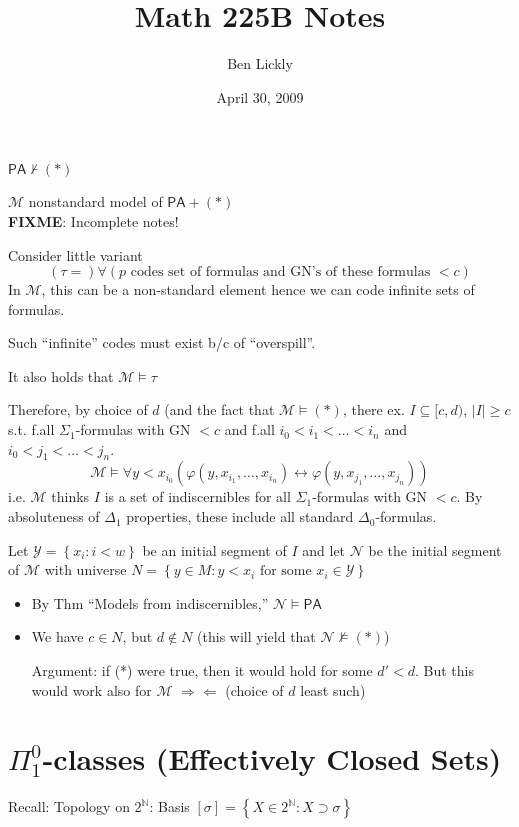\documentclass[12pt]{article}
\author{Ben Lickly}
\date{April 30, 2009}
\title{Math 225B Notes}
\newcommand{\Nat}{\ensuremath{\mathbb{N}}}
\newcommand{\PA}{\ensuremath{\mathsf{PA}}}
\newcommand{\proves}{\vdash}
\newcommand{\fixme}{\\ \textbf{FIXME}: Incomplete notes!}
\begin{document}
\maketitle

$\PA \not\proves (*)$

$\mathcal{M}$ nonstandard model of $\PA + (*)$
\fixme

Consider little variant
\[
(\tau = )
\forall (p \text{ codes set of formulas and GN's of these formulas $< c$})
\]
In $\mathcal{M}$, this can be a non-standard element hence we can code
infinite sets of formulas.

Such ``infinite'' codes must exist b/c of ``overspill''.

It also holds that $\mathcal{M} \models \tau$

Therefore, by choice of $d$ (and the fact that $\mathcal{M} \models (*)$,
there ex. $I \subseteq [c,d)$, $|I| \ge c$
s.t. f.all $\Sigma_1$-formulas with GN $< c$
and f.all $i_0 < i_1 < \dots < i_n$ and $i_0 < j_1 < \dots < j_n$.
\[
\mathcal{M} \models \forall y < x_{i_0} \left( \varphi(y,x_{i_1},\dots,x_{i_n})
\leftrightarrow \varphi(y,x_{j_1},\dots,x_{j_n})\right)
\]
i.e. $\mathcal{M}$ thinks $I$ is a set of indiscernibles for all
$\Sigma_1$-formulas with GN $< c$.
By absoluteness of $\Delta_1$ properties, these include all standard $\Delta_0$-formulas.

Let $\mathcal{Y} = \left\{ x_i : i < w \right\}$ be an initial segment of $I$
and let $\mathcal{N}$ be the initial segment of $\mathcal{M}$
with universe $N = \left\{ y\in M : y < x_i \text{ for some } x_i \in \mathcal{Y} \right\}$
\begin{itemize}
  \item By Thm ``Models from indiscernibles,'' $\mathcal{N} \models \PA$
  \item We have $c \in N$, but $d \not\in N$
    (this will yield that $\mathcal{N} \not\models (*)$)

    Argument: if (*) were true, then it would hold for some $d'<d$.
    But this would work also for $\mathcal{M}$
    $\Rightarrow\Leftarrow$ (choice of $d$ least such)
\end{itemize}

\section{$\Pi^0_1$-classes (Effectively Closed Sets)}

Recall: Topology on $2^\Nat$:
Basis $[\sigma] = \left\{ X \in 2^\Nat : X \supset \sigma \right\}$
\end{document}

